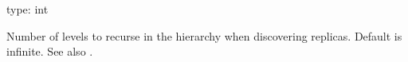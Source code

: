 \documentclass[letterpaper,10pt,english]{sphinxmanual}
\begin{document}
\begin{fulllineitems}
\label{\detokenize{mariadb-schema-change:cmdoption-mariadb-schema-change-recurse}}
\sphinxAtStartPar
type: int

\sphinxAtStartPar
Number of levels to recurse in the hierarchy when discovering replicas.
Default is infinite.  See also {\hyperref[\detokenize{mariadb-schema-change:cmdoption-mariadb-schema-change-recursion-method}]{}}.

\end{fulllineitems}

\end{document}

